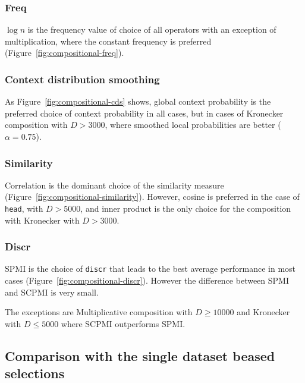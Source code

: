 \subsubsection{Freq}
\label{sec:freq-compositional}

$\log n$ is the frequency value of choice of all operators with an exception of multiplication, where the constant frequency is preferred (Figure~\ref{fig:compositional-freq}).

\subsubsection{Context distribution smoothing}
\label{sec:cont-distr-smooth-compositional}



As Figure~\ref{fig:compositional-cds} shows, global context probability is the preferred choice of context probability in all cases, but in cases of Kronecker composition with $D > 3000$, where smoothed local probabilities are better ($\alpha = 0.75$).

\subsubsection{Similarity}
\label{sec:similarity-compositional}

Correlation is the dominant choice of the similarity measure (Figure~\ref{fig:compositional-similarity}). However, cosine is preferred in the case of \texttt{head}, with $D > 5000$, and inner product is the only choice for the composition with Kronecker with $D > 3000$.

\subsubsection{Discr}
\label{sec:discr-compositional}



SPMI is the choice of \texttt{discr} that leads to the best average performance in most cases (Figure~\ref{fig:compositional-discr}). However the difference between SPMI and SCPMI is very small.

The exceptions are Multiplicative composition with $D \geq 10000$ and Kronecker with $D \leq 5000$ where SCPMI outperforms SPMI.

\subsection{Comparison with the single dataset beased selections}
\label{sec:comp-with-single-comp}

